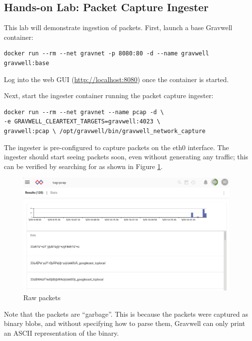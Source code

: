 \subsection{Hands-on Lab: Packet Capture Ingester}

This lab will demonstrate ingestion of packets. First, launch a base
Gravwell container:

\begin{Verbatim}[breaklines=true]
docker run --rm --net gravnet -p 8080:80 -d --name gravwell gravwell:base
\end{Verbatim}

Log into the web GUI (\href{http://localhost:8080}{http://localhost:8080}) once the container is started.

Next, start the ingester container running the packet capture
ingester:

\begin{Verbatim}[breaklines=true]
docker run --rm --net gravnet --name pcap -d \
-e GRAVWELL_CLEARTEXT_TARGETS=gravwell:4023 \
gravwell:pcap \ /opt/gravwell/bin/gravwell_network_capture
\end{Verbatim}


The ingester is pre-configured to capture packets on the eth0
interface. The ingester should start seeing packets soon, even without
generating any traffic; this can be verified by searching for
\code{tag=pcap} as shown in Figure \ref{fig:pcap-lab1}.

\begin{figure}
	\includegraphics{images/igst-pcap-lab1.png}
	\caption{Raw packets}
	\label{fig:pcap-lab1}
\end{figure}

Note that the packets are ``garbage''. This is because the packets were
captured as binary blobs, and without specifying how to parse them,
Gravwell can only print an ASCII representation of the binary.

